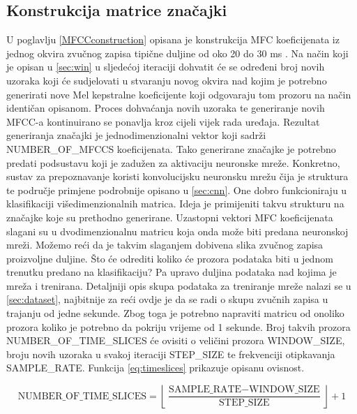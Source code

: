 \subsection{Konstrukcija matrice značajki}
\label{sec:featureImage}
U poglavlju \ref{MFCCconstruction} opisana je konstrukcija MFC koeficijenata iz jednog
okvira zvučnog zapisa tipične duljine od oko 20 do 30 ms \cite{wardentinyml}. 
Na način koji je opisan u
\ref{sec:win} u sljedećoj iteraciji dohvatit će se određeni broj novih uzoraka koji će
sudjelovati u stvaranju novog okvira nad kojim je 
potrebno generirati nove Mel kepstralne koeficijente koji odgovaraju tom prozoru na način
identičan opisanom. Proces dohvaćanja novih uzoraka te generiranje novih MFCC-a kontinuirano
se ponavlja kroz cijeli vijek rada uređaja. Rezultat generiranja značajki je 
jednodimenzionalni vektor koji sadrži NUMBER\_OF\_MFCCS koeficijenata. Tako generirane značajke
je potrebno predati podsustavu koji je zadužen za aktivaciju neuronske mreže. Konkretno,
sustav za prepoznavanje koristi konvolucijsku neuronsku mrežu čija je struktura te 
područje primjene podrobnije opisano u \ref{sec:cnn}. One dobro funkcioniraju u klasifikaciji
višedimenzionalnih matrica. Ideja je primijeniti takvu strukturu na značajke koje su prethodno
generirane. Uzastopni vektori MFC koeficijenata slagani su u dvodimenzionalnu matricu koja
onda može biti predana neuronskoj mreži. Možemo reći da je takvim slaganjem dobivena slika
zvučnog zapisa proizvoljne duljine. Što će odrediti koliko će prozora podataka biti u jednom 
trenutku predano na klasifikaciju? Pa upravo duljina podataka nad kojima je mreža i trenirana.
Detaljniji opis skupa podataka za treniranje mreže nalazi se u \ref{sec:dataset}, najbitnije
za reći ovdje je da se radi o skupu zvučnih zapisa u trajanju od jedne sekunde. Zbog toga
je potrebno napraviti matricu od onoliko prozora koliko je potrebno da pokriju
vrijeme od 1 sekunde. Broj takvih prozora NUMBER\_OF\_TIME\_SLICES će ovisiti
o veličini prozora WINDOW\_SIZE,
broju novih uzoraka u svakoj iteraciji STEP\_SIZE te frekvenciji otipkavanja
SAMPLE\_RATE. Funkcija \ref{eq:timeslices} prikazuje opisanu ovisnost.

\begin{equation}
    \label{eq:timeslices}
    \text{NUMBER\_OF\_TIME\_SLICES} = \left\lfloor \frac{\text{SAMPLE\_RATE} - \text{WINDOW\_SIZE}}{\text{STEP\_SIZE}} \right\rfloor + 1
\end{equation}

